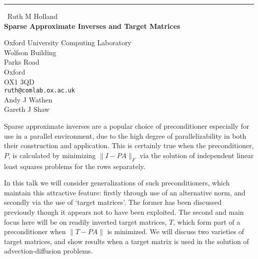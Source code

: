 \documentclass{report}
\begin{document}
\begin{center}
\rule{6in}{1pt} \
{\large Ruth M Holland \\
{\bf Sparse Approximate Inverses and Target Matrices}}

Oxford University Computing Laboratory \\ Wolfson Building \\ Parks Road \\ Oxford \\ OX1 3QD
\\
{\tt ruth@comlab.ox.ac.uk}\\
Andy J Wathen\\
Gareth J Shaw\end{center}

Sparse approximate inverses are a popular choice of preconditioner
especially for use in a parallel environment, due to the high degree of
parallelizability in both their construction and application. This is
certainly true when the preconditioner, $P$, is calculated by minimizing
$\|I-PA\|_{F}$ via the solution of independent linear least squares
problems for the rows separately.

In this talk we will consider generalizations of such preconditioners,
which maintain this attractive feature: firstly through use of an
alternative norm, and secondly via the use of `target matrices'. The
former has been discussed previously though it appears not to have been
exploited. The second and main focus here will be on readily inverted
target matrices, $T$, which form part of a preconditioner when $\|T-PA\|$
is minimized. We will discuss two varieties of target matrices, and show
results when a target matrix is used in the solution of
advection-diffusion problems.
\end{document}
